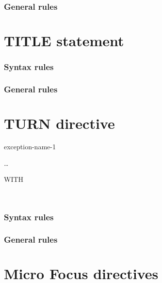 \subsubsection{General rules}

\section{TITLE statement}

\begin{syntax}[\miscextcolour]
   \literal
\end{syntax}

\subsubsection{Syntax rules}

\subsubsection{General rules}

\section{TURN directive}

\begin{syntax}
  \directiveindicator{}
  \begin{1=}
    exception-name-1
  \end{1=} \ldots
  \begin{1=}
    \begin{0-1}
      WITH 
    \end{0-1} \\

  \end{1=}
\end{syntax}

\subsubsection{Syntax rules}

\subsubsection{General rules}

\section{Micro Focus directives}

